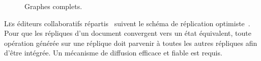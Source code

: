 
\begin{figure}
  \begin{center}
    
    \caption[Graphes complets]{\label{net:fig:completegraph}Graphes complets.}
  \end{center}
\end{figure}



\lettrine{L}es éditeurs collaboratifs répartis~\cite{ellis1991groupware} suivent
le schéma de réplication optimiste~\cite{demers1987epidemic,
  johnson1975maintenance, ladin1992providing, saito2005optimistic}. Pour que les
répliques d'un document convergent vers un état équivalent, toute opération
générée sur une réplique doit parvenir à toutes les autres répliques afin d'être
intégrée. Un mécanisme de diffusion efficace et fiable est requis.

